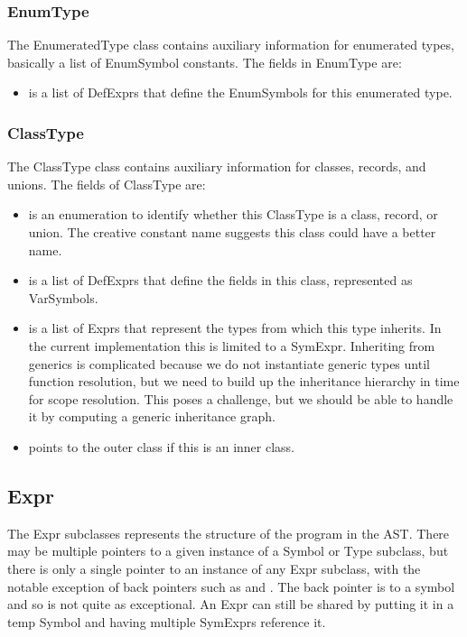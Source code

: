 \documentclass[10pt]{article}
\begin{document}
\subsubsection{EnumType}
\label{sec:enumtype}

The EnumeratedType class contains auxiliary information for enumerated
types, basically a list of EnumSymbol constants.  The fields in
EnumType are:
\begin{itemize}
\item {} is a list of DefExprs that define the
  EnumSymbols for this enumerated type.
\end{itemize}

\subsubsection{ClassType}
\label{sec:classtype}

The ClassType class contains auxiliary information for classes,
records, and unions.  The fields of ClassType are:
\begin{itemize}
\item {} is an enumeration to identify whether
  this ClassType is a class, record, or union.  The creative constant
  name  suggests this class could have a better name.
\item {} is a list of DefExprs that define the fields
  in this class, represented as VarSymbols.
\item {} is a list of Exprs that represent the types
  from which this type inherits.  In the current implementation this
  is limited to a SymExpr.  Inheriting from generics is complicated
  because we do not instantiate generic types until function
  resolution, but we need to build up the inheritance hierarchy in
  time for scope resolution.  This poses a challenge, but we should be
  able to handle it by computing a generic inheritance graph.
\item {} points to the outer class if this is an inner
  class.
\end{itemize}

\subsection{Expr}

The Expr subclasses represents the structure of the program in the
AST.  There may be multiple pointers to a given instance of a Symbol
or Type subclass, but there is only a single pointer
to an instance of any Expr subclass, with the notable exception of back pointers such
as  and .  The back pointer
 is to a symbol and so is not quite as exceptional.
An Expr can still be shared by putting it in a temp Symbol and
having multiple SymExprs reference it.
\end{document}
